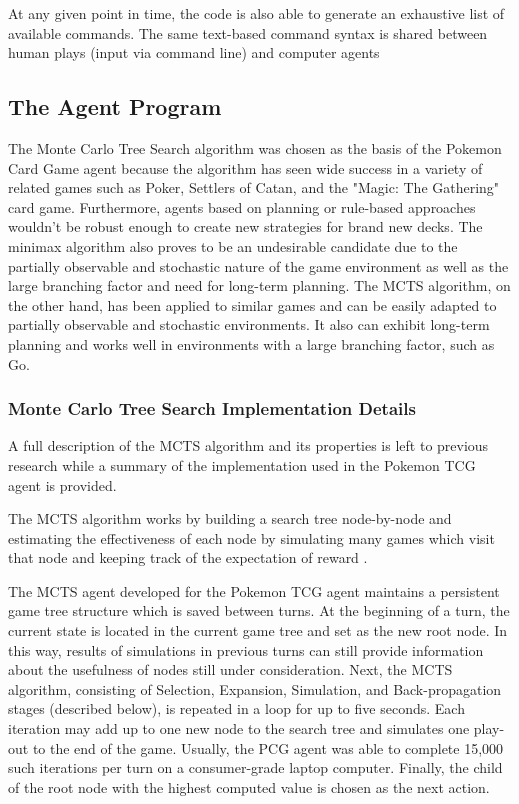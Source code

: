 \documentclass{article}
\begin{document}
At any given point in time, the code is also able to generate an exhaustive list of available commands.  The same text-based command syntax is shared between human plays (input via command line) and computer agents

\subsection{The Agent Program} %
The Monte Carlo Tree Search algorithm was chosen as the basis of the Pokemon Card Game agent because the algorithm has seen wide success in a variety of related games such as Poker, Settlers of Catan, and the "Magic: The Gathering" card game. Furthermore, agents based on planning or rule-based approaches wouldn't be robust enough to create new strategies for brand new decks. The minimax algorithm also proves to be an undesirable candidate due to the partially observable and stochastic nature of the game environment as well as the large branching factor and need for long-term planning. The MCTS algorithm, on the other hand, has been applied to similar games and can be easily adapted to partially observable and stochastic environments. It also can exhibit long-term planning and works well in environments with a large branching factor, such as Go. 

\subsubsection{Monte Carlo Tree Search Implementation Details} %
A full description of the MCTS algorithm and its properties is left to previous research while a summary of the implementation used in the Pokemon TCG agent is provided. 

The MCTS algorithm works by building a search tree node-by-node and estimating the effectiveness of each node by simulating many games which visit that node and keeping track of the expectation of reward \cite{mctsweb}. 

The MCTS agent developed for the Pokemon TCG agent maintains a persistent game tree structure which is saved between turns. At the beginning of a turn, the current state is located in the current game tree and set as the new root node. In this way, results of simulations in previous turns can still provide information about the usefulness of nodes still under consideration. Next, the MCTS algorithm, consisting of Selection, Expansion, Simulation, and Back-propagation stages (described below), is repeated in a loop for up to five seconds. Each iteration may add up to one new node to the search tree and simulates one play-out to the end of the game. Usually, the PCG agent was able to complete 15,000 such iterations per turn on a consumer-grade laptop computer. Finally, the child of the root node with the highest computed value is chosen as the next action. 
\end{document}
